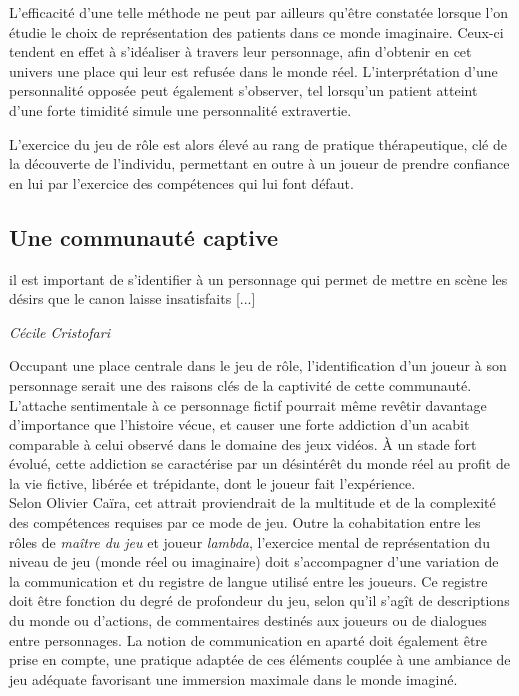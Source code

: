 L'efficacité d'une telle méthode ne peut par ailleurs qu'être constatée lorsque l'on étudie le choix de représentation des patients dans ce monde imaginaire. Ceux-ci tendent en effet à s'idéaliser à travers leur personnage, afin d'obtenir en cet univers une place qui leur est refusée dans le monde réel. L'interprétation d'une personnalité opposée peut également s'observer, tel lorsqu'un patient atteint d'une forte timidité simule une personnalité extravertie.

L'exercice du jeu de rôle est alors élevé au rang de pratique thérapeutique, clé de la découverte de l'individu, permettant en outre à un joueur de prendre confiance en lui par l'exercice des compétences qui lui font défaut.



\subsection{Une communauté captive}

\begin{shadequote}
[...] il est important de s’identifier à un personnage qui permet de mettre en scène les désirs que le canon laisse insatisfaits [...]
\par\emph{C{\'e}cile Cristofari}
\end{shadequote}

Occupant une place centrale dans le jeu de rôle, l'identification d'un joueur à son personnage serait une des raisons clés de la captivité de cette communauté. L'attache sentimentale à ce personnage fictif pourrait même revêtir davantage d'importance que l'histoire vécue, et causer une forte addiction d'un acabit comparable à celui observé dans le domaine des jeux vidéos. \`A un stade fort évolué, cette addiction se caractérise par un désintérêt du monde réel au profit de la vie fictive, libérée et trépidante, dont le joueur fait l'expérience.\\


Selon Olivier Caïra\cite{caira2007jeux}, cet attrait proviendrait de la multitude et de la complexité des compétences requises par ce mode de jeu. Outre la cohabitation entre les rôles de \textit{maître du jeu} et joueur \textit{lambda}, l'exercice mental de représentation du niveau de jeu (monde réel ou imaginaire) doit s'accompagner d'une variation de la communication et du registre de langue utilisé entre les joueurs. Ce registre doit être fonction du degré de profondeur du jeu, selon qu'il s'agît de descriptions du monde ou d'actions, de commentaires destinés aux joueurs ou de dialogues entre personnages. La notion de communication en aparté doit également être prise en compte, une pratique adaptée de ces éléments couplée à une ambiance de jeu adéquate favorisant une immersion maximale dans le monde imaginé.

